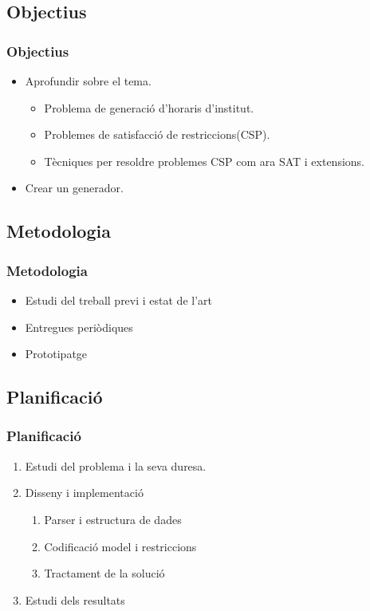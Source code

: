 \documentclass[11pt]{beamer}
\begin{document}
  \subsection{Objectius}

  \begin{frame}
    \frametitle{Objectius}

    \begin{itemize}
    
      \item Aprofundir sobre el tema.
       \begin{itemize}
        \item Problema de generació d'horaris d'institut.
        \item Problemes de satisfacció de restriccions(CSP).
        \item Tècniques per resoldre problemes CSP com ara SAT i extensions.
       \end{itemize}
      \item Crear un generador.
    
    \end{itemize}
          
  \end{frame}
  
  \subsection{Metodologia}
  \begin{frame}
    \frametitle{Metodologia}
    \begin{itemize}
      \item Estudi del treball previ i estat de l'art
      \item Entregues periòdiques
      \item Prototipatge
    \end{itemize}

  \end{frame}

  \subsection{Planificació}
  \begin{frame}
    \frametitle{Planificació}
    \begin{enumerate}
      \item Estudi del problema i la seva duresa.
      \item Disseny i implementació
      \begin{enumerate}
        \item Parser i estructura de dades
        \item Codificació model i restriccions
        \item Tractament de la solució
      \end{enumerate}
      \item Estudi dels resultats
        \end{enumerate}

  \end{frame}
\end{document}
